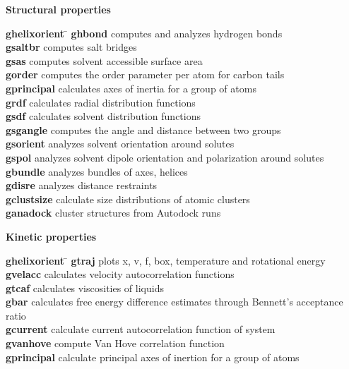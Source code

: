 \begin{description}
\item {\large\bf Structural properties}
\vspace{-2ex}\begin{tabbing}
{\bf g\us{}helixorient} \= \kill
{\bf g\us{}hbond} \> computes and analyzes hydrogen bonds \\
{\bf g\us{}saltbr} \> computes salt bridges \\
{\bf g\us{}sas} \> computes solvent accessible surface area \\
{\bf g\us{}order} \> computes the order parameter per atom for carbon tails \\
{\bf g\us{}principal} \> calculates axes of inertia for a group of atoms \\
{\bf g\us{}rdf} \> calculates radial distribution functions \\
{\bf g\us{}sdf} \> calculates solvent distribution functions \\
{\bf g\us{}sgangle} \> computes the angle and distance between two groups \\
{\bf g\us{}sorient} \> analyzes solvent orientation around solutes \\
{\bf g\us{}spol} \> analyzes solvent dipole orientation and polarization around solutes \\
{\bf g\us{}bundle} \> analyzes bundles of axes, {\eg} helices \\
{\bf g\us{}disre} \> analyzes distance restraints \\
{\bf g\us{}clustsize} \> calculate size distributions of atomic clusters \\
{\bf g\us{}anadock} \> cluster structures from Autodock runs \\
\end{tabbing}\vspace{-2ex}

\item {\large\bf Kinetic properties}
\vspace{-2ex}\begin{tabbing}
{\bf g\us{}helixorient} \= \kill
{\bf g\us{}traj} \> plots x, v, f, box, temperature and rotational energy \\
{\bf g\us{}velacc} \> calculates velocity autocorrelation functions \\
{\bf g\us{}tcaf} \> calculates viscosities of liquids \\
{\bf g\us{}bar} \> calculates free energy difference estimates through Bennett's acceptance ratio \\
{\bf g\us{}current} \> calculate current autocorrelation function of system \\
{\bf g\us{}vanhove} \> compute Van Hove correlation function \\
{\bf g\us{}principal} \> calculate principal axes of inertion for a group of atoms \\
\end{tabbing}\vspace{-2ex}


\end{description}
